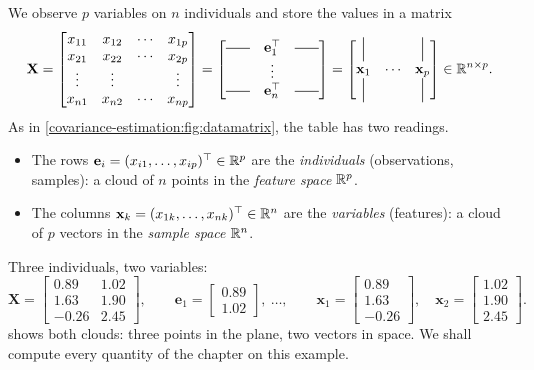 \begin{notechapter}
We observe $p$ variables on $n$ individuals and store the values in a matrix
\[
  \mathbf X =
  \begin{bmatrix}
    x_{11} & x_{12} & \cdots & x_{1p}\\
    x_{21} & x_{22} & \cdots & x_{2p}\\
    \vdots & \vdots & & \vdots\\
    x_{n1} & x_{n2} & \cdots & x_{np}
  \end{bmatrix}
  =
  \begin{bmatrix}
    \horzbar & \mathbf e_1^\top & \horzbar\\
     & \vdots & \\
    \horzbar & \mathbf e_n^\top & \horzbar
  \end{bmatrix}
  =
  \begin{bmatrix}
    \vertbar & & \vertbar\\
    \mathbf x_1 & \cdots & \mathbf x_p\\
    \vertbar & & \vertbar
  \end{bmatrix}\in\R^{n\times p}.
\]
As in \cref{covariance-estimation:fig:datamatrix}, the table has two readings.
\begin{itemize}
  \item The rows $\mathbf e_i = (x_{i1},\dots,x_{ip})^\top\in\mathbb{R}^p$ are the \emph{individuals}
        (observations, samples): a cloud of $n$ points in the \emph{feature space} $\mathbb{R}^p$.
  \item The columns $\mathbf x_k = (x_{1k},\dots,x_{nk})^\top\in\mathbb{R}^n$ are the \emph{variables}
        (features): a cloud of $p$ vectors in the \emph{sample space} $\mathbb{R}^n$.
\end{itemize}

\begin{example}\label{pca-overview:ex:running}
Three individuals, two variables:
\[
  \mathbf X = \begin{bmatrix}0.89 & 1.02\\ 1.63 & 1.90\\ -0.26 & 2.45\end{bmatrix},
  \qquad \mathbf e_1 = \begin{bmatrix}0.89\\1.02\end{bmatrix},\ \dots,\qquad
  \mathbf x_1 = \begin{bmatrix}0.89\\1.63\\-0.26\end{bmatrix},\quad
  \mathbf x_2 = \begin{bmatrix}1.02\\1.90\\2.45\end{bmatrix}.
\]
 shows both clouds: three points in the plane, two vectors
in space. We shall compute every quantity of the chapter on this example.
\end{example}


\end{notechapter}
